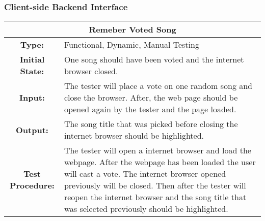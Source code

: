 \documentclass[12pt, titlepage]{article}
\begin{document}
\subsubsection{Client-side Backend Interface}

\begin{center}
\begin{table}[H]
\begin{tabularx}{\textwidth}{| c X |}
\hline
\multicolumn{2}{|c|}{\textbf{Remeber Voted Song}}\\
\hline
\textbf{Type: } & Functional, Dynamic, Manual Testing\\

\textbf{Initial State: } & One song should have been voted and the internet browser closed.\\

\textbf{Input: } & The tester will place a vote on one random song and close the browser. After, the web page should be opened again by the tester and the page loaded.\\

\textbf{Output: } & The song title that was picked before closing the internet browser should be highlighted.\\

\textbf{Test Procedure: } & The tester will open a internet browser and load the webpage. After the webpage has been loaded the user will cast a vote. The internet browser opened previously will be closed. Then after the tester will reopen the internet browser and the song title that was selected previously should be highlighted.\\
\hline
\end{tabularx}
\end{table}
\end{center}
\end{document}
